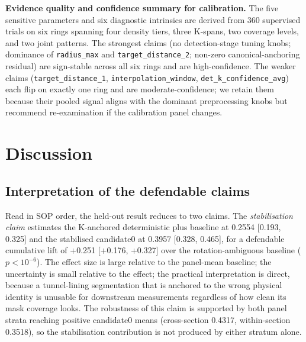 \documentclass[a4paper,fleqn]{cas-dc}
\begin{document}
\textbf{Evidence quality and confidence summary for calibration.} The five sensitive parameters and six diagnostic intrinsics are derived from 360 supervised trials on six rings spanning four density tiers, three K-spans, two coverage levels, and two joint patterns. The strongest claims (no detection-stage tuning knobs; dominance of \texttt{radius\_max} and \texttt{target\_distance\_2}; non-zero canonical-anchoring residual) are sign-stable across all six rings and are high-confidence. The weaker claims (\texttt{target\_distance\_1}, \texttt{interpolation\_window}, \texttt{det\_k\_confidence\_avg}) each flip on exactly one ring and are moderate-confidence; we retain them because their pooled signal aligns with the dominant preprocessing knobs but recommend re-examination if the calibration panel changes.


\section{Discussion}\label{sec:discussion}

\subsection{Interpretation of the defendable claims}

Read in SOP order, the held-out result reduces to two claims. The \emph{stabilisation claim} estimates the K-anchored deterministic plus baseline at 0.2554 [0.193, 0.325] and the stabilised candidate0 at 0.3957 [0.328, 0.465], for a defendable cumulative lift of +0.251 [+0.176, +0.327] over the rotation-ambiguous baseline ($p<10^{-6}$). The effect size is large relative to the panel-mean baseline; the uncertainty is small relative to the effect; the practical interpretation is direct, because a tunnel-lining segmentation that is anchored to the wrong physical identity is unusable for downstream measurements regardless of how clean its mask coverage looks. The robustness of this claim is supported by both panel strata reaching positive candidate0 means (cross-section 0.4317, within-section 0.3518), so the stabilisation contribution is not produced by either stratum alone.
\end{document}
